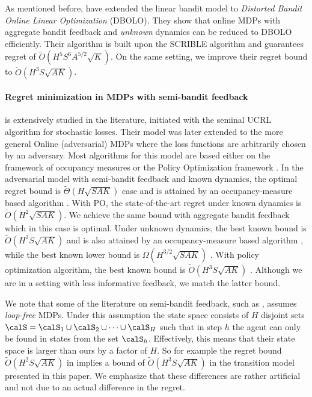 As mentioned before, \citet{cohen2021online} have extended the linear bandit model to \textit{Distorted Bandit Online Linear Optimization} (DBOLO). They show that online MDPs with aggregate bandit feedback and \textit{unknown} dynamics can be reduced to DBOLO efficiently. Their algorithm is built upon the SCRIBLE algorithm \citep{abernethy2008competing} and guarantees regret of $\tilde O(H^5 S^6 A^{5/2} \sqrt{K})$. On the same setting, we improve their regret bound to $\tilde O(H^3 S \sqrt{A K})$.
\paragraph{\bf Regret minimization in MDPs with semi-bandit feedback\hspace{-0.5em}} is extensively studied in the literature, initiated with the seminal UCRL algorithm \citep{jaksch2010near} for stochastic losses. Their model was later extended to the more general Online (adversarial) MDPs where the loss functions are arbitrarily chosen by an adversary. Most algorithms for this model are based either on the framework of occupancy measures  \citep{zimin2013online,rosenberg2019bandit,rosenberg2019online,jin2019learning} or the Policy Optimization framework \citep{even2009online,shani2020optimistic,luo2021policy}. In the adversarial model with semi-bandit feedback and known dynamics, the optimal regret bound is $\tilde \Theta (H\sqrt{S A K})$ case and is attained by an occupancy-measure based algorithm \citep{zimin2013online}. With PO, the state-of-the-art regret under known dynamics is $\tilde O (H^{2}\sqrt{S A K})$. We achieve the same bound with aggregate bandit feedback which in this case is optimal. 
Under unknown dynamics, the best known bound is $\tilde O (H^{2} S\sqrt{A K})$ and is also attained by an occupancy-measure based algorithm \citep{jin2019learning}, while the best known lower bound is $\Omega(H^{3/2} \sqrt{S A K})$ \citep{jin2018q}. With policy optimization algorithm, the best known bound is $\tilde O (H^{3} S\sqrt{A K})$ \citep{luo2021policy}. Although we are in a setting with less informative feedback, we match the latter bound.
% 

\begin{remark}
    \label{remark:loop-free}
    We note that some of the literature on semi-bandit feedback, such as \citet{jin2019learning, luo2021policy}, assumes \textit{loop-free} MDPs. Under this assumption the state space consists of $H$ disjoint sets $\calS = \calS_1 \cup \calS_2 \cup \dots \cup \calS_H$ such that in step $h$ the agent can only be found in states from the set $\calS_h$.
    Effectively, this means that their state space is larger than ours by a factor of $H$.
    So for example the regret bound $\tilde O(H^2 S \sqrt{A K})$ in \citet{luo2021policy} implies a bound of $\tilde O(H^3 S \sqrt{A K})$ in the transition model presented in this paper.
    We emphasize that these differences are rather artificial and not due to an actual difference in the regret.
\end{remark}



